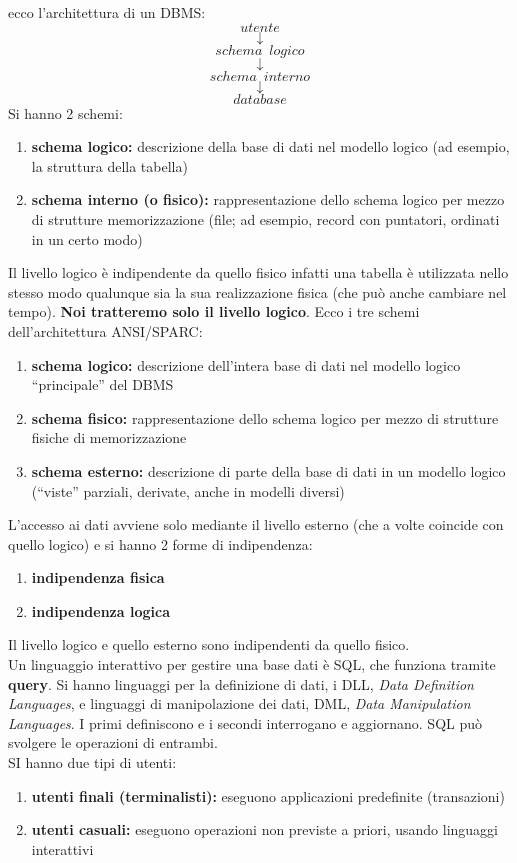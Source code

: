 \documentclass[a4paper,12pt, oneside]{book}
\begin{document}
ecco l'architettura di un DBMS:
$$utente$$
$$\downarrow$$
$$schema\,\,\,logico$$
$$\downarrow$$
$$schema\,\,\,interno$$
$$\downarrow$$
$$database$$
Si hanno 2 schemi:
\begin{enumerate}
\item \textbf{schema logico:} descrizione della base
di dati nel modello logico (ad esempio,
la struttura della tabella)
\item \textbf{schema interno (o fisico):}
rappresentazione dello schema logico
per mezzo di strutture memorizzazione
(file; ad esempio, record con puntatori,
ordinati in un certo modo)
\end{enumerate}
Il livello logico è indipendente da quello
fisico infatti una tabella è utilizzata nello stesso modo
qualunque sia la sua realizzazione fisica
(che può anche cambiare nel tempo). \textbf{Noi tratteremo solo il livello logico}.
Ecco i tre schemi dell'architettura ANSI/SPARC:
\begin{enumerate}
\item \textbf{schema logico: }descrizione dell'intera base di
dati nel modello logico “principale” del DBMS
\item \textbf{schema fisico: }rappresentazione dello
schema logico per mezzo di strutture fisiche
di memorizzazione
\item\textbf{ schema esterno:} descrizione di parte della
base di dati in un modello logico (“viste”
parziali, derivate, anche in modelli diversi)
\end{enumerate}
L'accesso ai dati avviene solo mediante il livello esterno (che a volte coincide con quello logico) e si hanno 2 forme di indipendenza:
\begin{enumerate}
\item \textbf{indipendenza fisica}
\item \textbf{indipendenza logica}
\end{enumerate}
Il livello logico e quello esterno sono
indipendenti da quello fisico.\\
Un linguaggio interattivo per gestire una base dati è SQL, che funziona tramite \textbf{query}. Si hanno linguaggi per la definizione di dati, i DLL, \textit{Data Definition Languages}, e linguaggi di manipolazione dei dati, DML, \textit{Data Manipulation Languages}. I primi definiscono e i secondi interrogano e aggiornano. SQL può svolgere le operazioni di entrambi.\\
SI hanno due tipi di utenti:
\begin{enumerate}
\item \textbf{utenti finali (terminalisti):} eseguono applicazioni
predefinite (transazioni)
\item \textbf{utenti casuali:} eseguono operazioni non previste
a priori, usando linguaggi interattivi
\end{enumerate}
\end{document}
